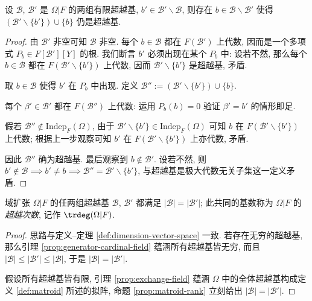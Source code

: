 \begin{lemma}[换元性质]\label{prop:exchange-field}
	设 $\mathcal{B}$, $\mathcal{B}'$ 是 $\Omega|F$ 的两组有限超越基, $b' \in \mathcal{B}' \smallsetminus \mathcal{B}$, 则存在 $b \in \mathcal{B} \smallsetminus \mathcal{B}'$ 使得 $(\mathcal{B}' \smallsetminus \{b'\}) \cup \{b\}$ 仍是超越基.
\end{lemma}
\begin{proof}
	由 $\mathcal{B}'$ 非空可知 $\mathcal{B}$ 非空.	每个 $b \in \mathcal{B}$ 都在 $F(\mathcal{B}')$ 上代数, 因而是一个多项式 $P_b \in F[\mathcal{B}'][Y]$ 的根. 我们断言 $b'$ 必须出现在某个 $P_b$ 中: 设若不然, 那么每个 $b \in \mathcal{B}$ 都在 $F(\mathcal{B}' \smallsetminus \{b'\})$ 上代数, 因而 $\mathcal{B}' \smallsetminus \{b'\}$ 是超越基, 矛盾.
	
	取 $b \in \mathcal{B}$ 使得 $b'$ 在 $P_b$ 中出现. 定义 $\mathcal{B}'' := (\mathcal{B}' \smallsetminus \{b'\}) \cup \{b\}$.
	\begin{compactenum}[(a)]
		\item 每个 $\beta' \in \mathcal{B}'$ 都在 $F(\mathcal{B}'')$ 上代数: 运用 $P_b(b)=0$ 验证 $\beta' = b'$ 的情形即足.
		\item 假若 $\mathcal{B}'' \notin \text{Indep}_F(\Omega)$, 由于 $\mathcal{B}' \smallsetminus \{b'\} \in \text{Indep}_F(\Omega)$ 可知 $b$ 在 $F(\mathcal{B}' \smallsetminus \{b'\})$ 上代数; 根据上一步观察可知 $b'$ 在 $F(\mathcal{B}' \smallsetminus \{b'\})$ 上亦代数, 矛盾.
	\end{compactenum}
	因此 $\mathcal{B}''$ 确为超越基. 最后观察到 $b \notin \mathcal{B}'$. 设若不然, 则 $b' \notin \mathcal{B} \implies b' \neq b \implies \mathcal{B}'' = \mathcal{B}' \smallsetminus \{b'\}$, 与超越基是极大代数无关子集这一定义矛盾.
\end{proof}

\begin{definition-theorem}
	域扩张 $\Omega|F$ 的任两组超越基 $\mathcal{B}$, $\mathcal{B}'$ 都满足 $|\mathcal{B}| = |\mathcal{B}'|$; 此共同的基数称为 $\Omega|F$ 的\emph{超越次数}, 记作 $\trdeg(\Omega|F)$.
\end{definition-theorem}
\begin{proof}
	思路与定义--定理 \ref{def:dimension-vector-space} 一致. 若存在无穷的超越基, 那么引理 \ref{prop:generator-cardinal-field} 蕴涵所有超越基皆无穷, 而且 $|\mathcal{B}| \leq |\mathcal{B}'| \leq |\mathcal{B}|$, 于是 $|\mathcal{B}|=|\mathcal{B}'|$.
		
	假设所有超越基皆有限, 引理 \ref{prop:exchange-field} 蕴涵 $\Omega$ 中的全体超越基构成定义 \ref{def:matroid} 所述的拟阵, 命题 \ref{prop:matroid-rank} 立刻给出 $|\mathcal{B}|=|\mathcal{B}'|$.
\end{proof}

